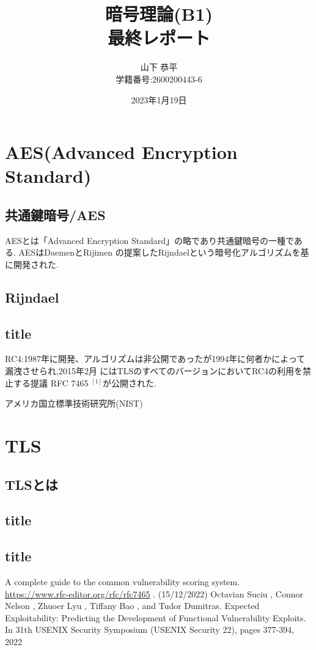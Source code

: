 \documentclass[dvipdfmx,autodetect-engine,titlepage]{jsarticle}
\title{暗号理論(B1)\\最終レポート}
\author{山下 恭平\\学籍番号:2600200443-6}
\date{2023年1月19日}
\begin{document}
\maketitle

\section{AES(Advanced Encryption Standard)}


\subsection{共通鍵暗号/AES}

AESとは「Advanced Encryption Standard」の略であり共通鍵暗号の一種である.
AESはDaemenとRijimen の提案したRijndaelという暗号化アルゴリズムを基に開発された.

\subsection{Rijndael}

\subsection{title}

RC4:1987年に開発、アルゴリズムは非公開であったが1994年に何者かによって漏洩させられ,2015年2月
にはTLSのすべてのバージョンにおいてRC4の利用を禁止する提議 RFC 7465 \begin{math}
  ^{[1]}
\end{math}が公開された.

アメリカ国立標準技術研究所(NIST)



\section{TLS}

\subsection{TLSとは}

\subsection{title}

\subsection{title}

\begin{thebibliography}{99}
    A complete guide to the common vulnerability scoring system.\\
      \url{https://www.rfc-editor.org/rfc/rfc7465} . (15/12/2022)
     Octavian Suciu , Connor Nelson , Zhuoer Lyu , Tiffany Bao , and Tudor Dumitras.
    \quad Expected Exploitability: Predicting the Development of Functional Vulnerability 
    Exploits. In 31th USENIX Security Symposium (USENIX Security 22), pages 377-394, 2022
\end{thebibliography}
\end{document}
